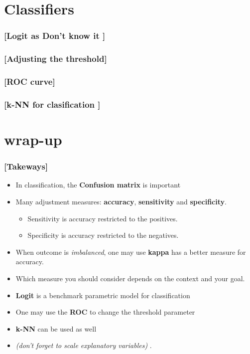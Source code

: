 \documentclass[xcolor=x11names,compress, handhouts]{beamer}
\renewcommand{\(}{\begin{columns}}
\renewcommand{\)}{\end{columns}}
\newcommand{\<}[1]{\begin{column}{#1}}
\renewcommand{\>}{\end{column}}
\begin{document}
\section{Classifiers}



\begin{frame} %
\frametitle{\textcolor{brique}{[Logit as Don't know it ]}}

\end{frame}




\begin{frame} %
\frametitle{\textcolor{brique}{[Adjusting the threshold]}}

\end{frame}



\begin{frame} %
\frametitle{\textcolor{brique}{[ROC curve]}}

\end{frame}



\begin{frame} %
\frametitle{\textcolor{brique}{[k-NN for clasification ]}}

\end{frame}

\section{wrap-up}



\begin{frame} %
\frametitle{\textcolor{brique}{[Takeways]}}
\begin{itemize}[<+->]
  \item In classification, the \textbf{Confusion matrix} is important
 \item Many adjustment measures:  \textbf{accuracy}, \textbf{sensitivity} and \textbf{specificity}.
    \begin{itemize}[<+->]
      \item Sensitivity is accuracy restricted to the positives.
      \item Specificity is accuracy restricted to the negatives.
   \end{itemize}
 \item When  outcome is \textit{imbalanced}, one may use \textbf{kappa} has a better measure for accuracy.
  \item[] Which measure you should consider depends on the context and your goal.
 \item \textbf{Logit} is a benchmark parametric model for classification
 \item[] One may use the \textbf{ROC} to change the threshold parameter
 \item \textbf{k-NN} can be used as well
 \item[] \textit{(don't forget to scale explanatory variables) }.
\end{itemize}
\end{frame}



\end{document}
